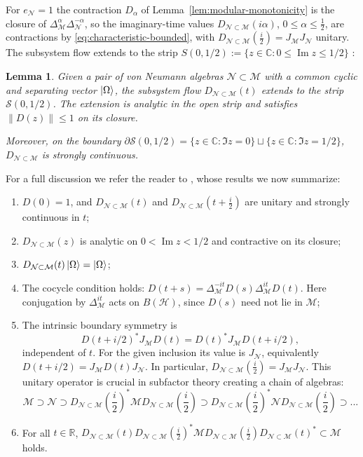 \documentclass[a4paper,11pt]{article}
\newtheorem{lemma}[theorem]{Lemma}
\theoremstyle{definition}
\newcommand{\mN}{\mathcal{N}}
\newcommand{\mH}{\mathcal{H}}
\newcommand{\mM}{\mathcal{M}}
\begin{document}
For $e_{\mN}=1$ the contraction $D_\alpha$ of Lemma~\ref{lem:modular-monotonicity} is the closure of $\Delta_{\mM}^{\alpha}\Delta_{\mN}^{-\alpha}$, so the imaginary-time values $D_{\mN\subset\mM}(i\alpha)$, $0\le\alpha\le\tfrac12$, are contractions by \eqref{eq:characteristic-bounded}, with $D_{\mN\subset\mM}(\tfrac i2)=J_{\mM}J_{\mN}$ unitary. The subsystem flow extends to the strip $S(0,1/2):=\{z\in\mathbb C:0\leq\operatorname{Im}z\leq1/2\}$ \cite{revolutionizing}:
\begin{lemma}
    Given a pair of von Neumann algebras $\mN\subset\mM$ with a common cyclic and separating vector $\ket{\Omega}$, the subsystem flow $D_{\mN\subset\mM}(t)$ extends to the strip $\mathcal{S}(0,1/2)$. The extension is analytic in the open strip and satisfies $\|D(z)\|\leq1$ on its closure.

    Moreover, on the boundary $\partial\mathcal{S}(0,1/2) = \{z\in\mathbb{C}:\Im{z} = 0\}\sqcup\{z\in\mathbb{C}:\Im{z} = 1/2\}$, $D_{\mN\subset\mM}$ is strongly continuous.
\end{lemma}
For a full discussion we refer the reader to \cite{revolutionizing}, whose results we now summarize:
\begin{enumerate}
    \item $D(0)=1$, and $D_{\mN\subset\mM}(t)$ and $D_{\mN\subset\mM}(t +\frac{i}{2})$ are unitary and strongly continuous in $t$;
    \item $D_{\mN\subset\mM}(z)$ is analytic on $0<\operatorname{Im}z<1/2$ and contractive on its closure;
    \item $D_{\mN\subset\mM}(t)\ket{\Omega} = \ket{\Omega}$;
    \item The cocycle condition holds: $D(t+s)=\Delta_{\mM}^{-it}D(s)\Delta_{\mM}^{it}D(t)$. Here conjugation by $\Delta_{\mM}^{it}$ acts on $B(\mH)$, since $D(s)$ need not lie in $\mM$;
    \item The intrinsic boundary symmetry is
    \[
     D(t+i/2)^*J_{\mM} D(t)=D(t)^*J_{\mM} D(t+i/2),
    \]
    independent of $t$. For the given inclusion its value is $J_{\mN}$, equivalently
    $D(t+i/2)=J_{\mM} D(t)J_{\mN}$. In particular, $D_{\mN\subset\mM}(\frac{i}{2}) = J_{\mM}J_{\mN}$. This unitary operator is crucial in subfactor theory creating a chain of algebras:
    \begin{equation}
        \mM\supset\mN\supset D_{\mN\subset\mM}(\frac{i}{2})^*\mM D_{\mN\subset\mM}(\frac{i}{2})\supset D_{\mN\subset\mM}(\frac{i}{2})^*\mN D_{\mN\subset\mM}(\frac{i}{2})\supset...
    \end{equation}
    \item For all $t\in\mathbb{R}$, $D_{\mN\subset\mM}(t)D_{\mN\subset\mM}(\frac{i}{2})^*\mM D_{\mN\subset\mM}(\frac{i}{2})D_{\mN\subset\mM}(t)^*\subset\mM$ holds.
\end{enumerate}
\end{document}
